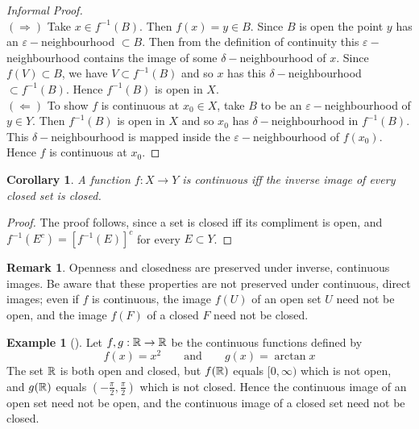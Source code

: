 \documentclass[	DIV=calc,paper=a4,fontsize=11pt]{scrartcl}	 	%
\newtheorem{cor}[thm]{Corollary}
\theoremstyle{definition}
\newtheorem{exmp}[thm]{Example}
\newtheorem{rem}[thm]{Remark}
\theoremstyle{plain}
\theoremstyle{remark}
\begin{document}
\begin{proof}[Informal Proof]
\\
\color{black}
$(\Rightarrow)$ Take $x\in f^{-1}(B)$. Then $f(x)=y\in B$. Since $B$ is open the point $y$ has an $\varepsilon-$neighbourhood $\subset B$. Then from the definition of continuity this $\varepsilon-$neighbourhood contains the image of some $\delta-$neighbourhood of $x$. Since $f(V)\subset B$, we have $V\subset f^{-1}(B)$ and so $x$ has this $\delta-$neighbourhood $\subset f^{-1}(B).$ Hence $f^{-1}(B)$ is open in $X$.\\
$(\Leftarrow)$ To show $f$ is continuous at $x_0\in X$, take $B$ to be an $\varepsilon-$neighbourhood of $y\in Y$. Then $f^{-1}(B)$ is open in $X$ and so $x_0$ has $\delta-$neighbourhood in $f^{-1}(B)$. This $\delta-$neighbourhood is mapped inside the $\varepsilon-$neighbourhood of $f(x_0)$. Hence $f$ is continuous at $x_0$.
\end{proof}

\begin{cor}
A function $f:X\to Y$ is continuous iff the inverse image of every closed set is closed.
\end{cor}
\begin{proof}
The proof follows, since a set is closed iff its compliment is open, and $f^{-1}(E^c)=[f^{-1}(E)]^c$ for every $E\subset Y$.
\end{proof}

\begin{rem}\color{red}
Openness and closedness are preserved under inverse, continuous images. Be aware that these properties are not preserved under continuous, direct images; even if $f$ is continuous, the image $f(U)$ of an open set $U$ need not be open, and the image $f(F)$ of a closed $F$ need not be closed.
\end{rem}
\begin{exmp}[]
Let $f,g : \Bbb R\to \Bbb R$ be the continuous functions defined by
\[f(x) = x^2\qquad \text{and}\qquad g(x) = \arctan x\]
The set $\Bbb R$ is both open and closed, but $f(\Bbb R)$ equals $[0, \infty)$ which is not open, and $g(\Bbb R)$ equals $(-\frac{\pi}{2}, \frac{\pi}{2})$ which is not closed. Hence the continuous image of an open set need not be open, and the continuous image of a closed set need not be closed.
\end{exmp}
\end{document}
